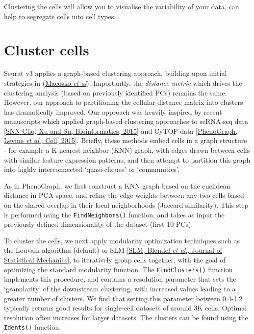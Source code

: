 \documentclass[
]{book}
\begin{document}
Clustering the cells will allow you to visualise the variability of your data, can help to segregate cells into cell types.

\hypertarget{section-9}{%
\subsubsection*{}\label{section-9}}

\hypertarget{cluster-cells}{%
\section{Cluster cells}\label{cluster-cells}}

Seurat v3 applies a graph-based clustering approach, building upon initial strategies in (\href{http://www.cell.com/abstract/S0092-8674(15)00549-8}{Macosko \emph{et al}}). Importantly, the \emph{distance metric} which drives the clustering analysis (based on previously identified PCs) remains the same. However, our approach to partitioning the cellular distance matrix into clusters has dramatically improved. Our approach was heavily inspired by recent manuscripts which applied graph-based clustering approaches to scRNA-seq data \href{http://bioinformatics.oxfordjournals.org/content/early/2015/02/10/bioinformatics.btv088.abstract}{{[}SNN-Cliq, Xu and Su, Bioinformatics, 2015{]}} and CyTOF data \href{http://www.ncbi.nlm.nih.gov/pubmed/26095251}{{[}PhenoGraph, Levine \emph{et al}., Cell, 2015{]}}. Briefly, these methods embed cells in a graph structure - for example a K-nearest neighbor (KNN) graph, with edges drawn between cells with similar feature expression patterns, and then attempt to partition this graph into highly interconnected `quasi-cliques' or `communities'.

As in PhenoGraph, we first construct a KNN graph based on the euclidean distance in PCA space, and refine the edge weights between any two cells based on the shared overlap in their local neighborhoods (Jaccard similarity). This step is performed using the \texttt{FindNeighbors()} function, and takes as input the previously defined dimensionality of the dataset (first 10 PCs).

To cluster the cells, we next apply modularity optimization techniques such as the Louvain algorithm (default) or SLM \href{http://dx.doi.org/10.1088/1742-5468/2008/10/P10008}{{[}SLM, Blondel \emph{et al}., Journal of Statistical Mechanics{]}}, to iteratively group cells together, with the goal of optimizing the standard modularity function. The \texttt{FindClusters()} function implements this procedure, and contains a resolution parameter that sets the `granularity' of the downstream clustering, with increased values leading to a greater number of clusters. We find that setting this parameter between 0.4-1.2 typically returns good results for single-cell datasets of around 3K cells. Optimal resolution often increases for larger datasets. The clusters can be found using the \texttt{Idents()} function.
\end{document}

